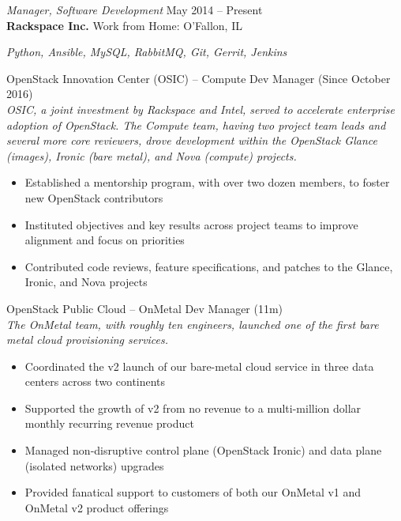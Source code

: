 \documentclass[margin,line]{resume}
\begin{document}
\begin{resume}
{\sl Manager, Software Development} \hfill
     May 2014 -- Present\\
     \textbf{Rackspace Inc.} \hfill
     Work from Home: O'Fallon, IL\\[4pt]
{\small\centering\textit{Python, Ansible, MySQL, RabbitMQ, Git, Gerrit, Jenkins}\par}\vspace*{-\baselineskip}
\vspace{4pt}
{\small OpenStack Innovation Center (OSIC) -- Compute  \hfill  Dev Manager (Since October 2016)}\\
{\small\textit{OSIC, a joint investment by Rackspace and Intel, served to accelerate enterprise adoption of OpenStack.
The Compute team, having two project team leads and several more core reviewers, drove development within the OpenStack
Glance (images), Ironic (bare metal), and Nova (compute) projects.}}
\begin{itemize} \itemsep -2pt %
\small\item Established a mentorship program, with over two dozen members, to foster new OpenStack contributors
\small\item Instituted objectives and key results across project teams to improve alignment and focus on priorities
\small\item Contributed code reviews, feature specifications, and patches to the Glance, Ironic, and Nova projects
\end{itemize}\vspace*{-\baselineskip} %
\vspace{4pt}
{\small OpenStack Public Cloud -- OnMetal  \hfill  Dev Manager (11m)}\\
{\small\textit{The OnMetal team, with roughly ten engineers, launched one of the first bare metal cloud provisioning services.}}
\begin{itemize} \itemsep -2pt %
\small\item Coordinated the v2 launch of our bare-metal cloud service in three data centers across two continents
\small\item Supported the growth of v2 from no revenue to a multi-million dollar monthly recurring revenue product
\small\item Managed non-disruptive control plane (OpenStack Ironic) and data plane (isolated networks) upgrades
\small\item Provided fanatical support to customers of both our OnMetal v1 and OnMetal v2 product offerings

\end{itemize}
\end{resume}
\end{document}
